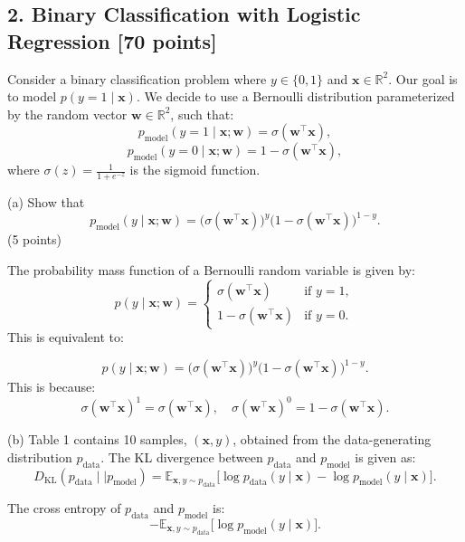 \documentclass[a3paper,12pt]{article} %
\begin{document}
\vspace{30pt}
\subsection*{2. Binary Classification with Logistic Regression [70 points]} 

Consider a binary classification problem where $y \in \{0, 1\}$ and $\mathbf{x} \in \mathbb{R}^2$. Our goal is to model $p(y = 1 \mid \mathbf{x})$. We decide to use a Bernoulli distribution parameterized by the random vector $\mathbf{w} \in \mathbb{R}^2$, such that:
\[
p_{\text{model}}(y = 1 \mid \mathbf{x}; \mathbf{w}) = \sigma(\mathbf{w}^\top \mathbf{x}),
\]
\[
p_{\text{model}}(y = 0 \mid \mathbf{x}; \mathbf{w}) = 1 - \sigma(\mathbf{w}^\top \mathbf{x}),
\]
where $\sigma(z) = \frac{1}{1 + e^{-z}}$ is the sigmoid function.

(a) Show that
\[
p_{\text{model}}(y \mid \mathbf{x}; \mathbf{w}) = \big(\sigma(\mathbf{w}^\top \mathbf{x})\big)^y \big(1 - \sigma(\mathbf{w}^\top \mathbf{x})\big)^{1-y}.
\]
\hfill (5 points)

The probability mass function of a Bernoulli random variable is given by:
\[
p(y \mid \mathbf{x}; \mathbf{w}) = \begin{cases}
\sigma(\mathbf{w}^\top \mathbf{x}) & \text{if } y = 1, \\
1 - \sigma(\mathbf{w}^\top \mathbf{x}) & \text{if } y = 0.
\end{cases}
\]
This is equivalent to:

\[
p(y \mid \mathbf{x}; \mathbf{w}) = \big(\sigma(\mathbf{w}^\top \mathbf{x})\big)^y \big(1 - \sigma(\mathbf{w}^\top \mathbf{x})\big)^{1-y}.
\]
This is because:
\[
\sigma(\mathbf{w}^\top \mathbf{x})^1 = \sigma(\mathbf{w}^\top \mathbf{x}), \quad \sigma(\mathbf{w}^\top \mathbf{x})^0 = 1 - \sigma(\mathbf{w}^\top \mathbf{x}).
\]

(b)
Table 1 contains 10 samples, $(\mathbf{x}, y)$, obtained from the data-generating distribution $p_{\text{data}}$. The KL divergence between $p_{\text{data}}$ and $p_{\text{model}}$ is given as:
\[
D_{\text{KL}}(p_{\text{data}} \mid\mid p_{\text{model}}) = \mathbb{E}_{\mathbf{x}, y \sim p_{\text{data}}} \big[\log p_{\text{data}}(y \mid \mathbf{x}) - \log p_{\text{model}}(y \mid \mathbf{x})\big].
\]

The cross entropy of $p_{\text{data}}$ and $p_{\text{model}}$ is:
\[
-\mathbb{E}_{\mathbf{x}, y \sim p_{\text{data}}} \big[\log p_{\text{model}}(y \mid \mathbf{x})\big].
\]
\end{document}
